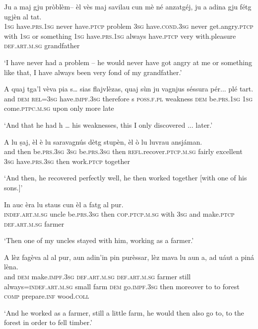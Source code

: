 \begin{linenumbers}
\gll Ju a maj gju pròblèm– èl vès maj savilau cun mè né anzatgéj, ju a adina gju fétg ugjèn al tat.   \\
 \textsc{1sg} have.\textsc{prs.1sg} never have.\textsc{ptcp} problem \textsc{3sg} have.\textsc{cond.3sg} never get.angry.\textsc{ptcp} with \textsc{1sg} or something \textsc{1sg} have.\textsc{prs.1sg} always have.\textsc{ptcp} very with.pleasure \textsc{def.art.m.sg} grandfather\\
\end{linenumbers}
\medskip
\glt `I have never had a problem – he would never have got angry at me or something like that, I have always been very fond of my grandfather.'
\medskip

\begin{linenumbers}
\gll A quaj tga’l vèva pia s… sias flajvlèzas, quaj sùn ju vagnjus séssura pér... plé tart.   \\
and \textsc{dem} \textsc{rel=3sg} have.\textsc{impf.3sg} therefore s \textsc{poss.f.pl} weakness \textsc{dem} be.\textsc{prs.1sg} \textsc{1sg} come.\textsc{ptpc.m.sg} upon only more late\\
\end{linenumbers}
\medskip
\glt `And that he had h … his weaknesses, this I only discovered ... later.'
\medskip

\begin{linenumbers}
\gll A lu ṣaj, èl è lu saravagnús dètg stupèn, èl ò lu luvrau ansjáman.   \\
and then be.\textsc{prs.3sg} \textsc{3sg} be.\textsc{prs.3sg} then \textsc{refl}.recover.\textsc{ptcp.m.sg} fairly  excellent \textsc{3sg} have.\textsc{prs.3sg} then work.\textsc{ptcp} together  \\
\end{linenumbers}
\medskip
\glt `And then, he recovered perfectly well, he then worked together [with one of his sons.]'
\medskip

\begin{linenumbers}
\gll  In auc èra lu staus cun èl a fatg al pur.  \\
 \textsc{indef.art.m.sg} uncle be.\textsc{prs.3sg} then \textsc{cop.ptcp.m.sg} with \textsc{3sg} and make.\textsc{ptcp} \textsc{def.art.m.sg} farmer   \\
\end{linenumbers}
\medskip
\glt `Then one of my uncles stayed with him, working as a farmer.'
\medskip

\begin{linenumbers}
\gll  A lèz fagèva al al pur, aun adin’in pin purèssar, lèz mava lu aun a, ad uáut a piná lèna.  \\
and \textsc{dem} make.\textsc{impf.3sg}  \textsc{def.art.m.sg} \textsc{def.art.m.sg} farmer still always=\textsc{indef.art.m.sg} small farm \textsc{dem} go.\textsc{impf.3sg} then moreover to to forest \textsc{comp} prepare.\textsc{inf} wood.\textsc{coll}   \\
\end{linenumbers}
\medskip
\glt `And he worked as a farmer, still a little farm, he would then also go to, to the forest in order to fell timber.'
\medskip

